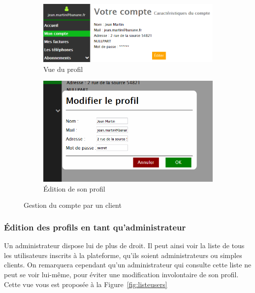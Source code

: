 \begin{figure}[ht]
  \centering
  \begin{subfigure}{.45\textwidth}
    \centering
    \includegraphics[width=.95\textwidth]{images/Plateforme/vue_profil_client}
    \caption{Vue du profil}
    \label{fig:vueprofilclient}
  \end{subfigure}\hfill%
  \begin{subfigure}{.45\textwidth}
    \centering
    \includegraphics[width=.95\textwidth]{images/Plateforme/vue_edition_profil}
    \caption{\'Edition de son profil}
    \label{fig:vueeditionclient}
  \end{subfigure}
  \caption{Gestion du compte par un client}
\end{figure}

\subsubsection{\'Edition des profils en tant qu'administrateur}
Un administrateur dispose lui de plus de droit. Il peut ainsi voir la liste de tous les utilisateurs inscrits à la plateforme, qu'ils soient administrateurs ou simples clients. On remarquera cependant qu'un administrateur qui consulte cette liste ne peut se voir lui-même, pour éviter une modification involontaire de son profil. Cette vue vous est proposée à la Figure~\ref{fig:listeusers}

